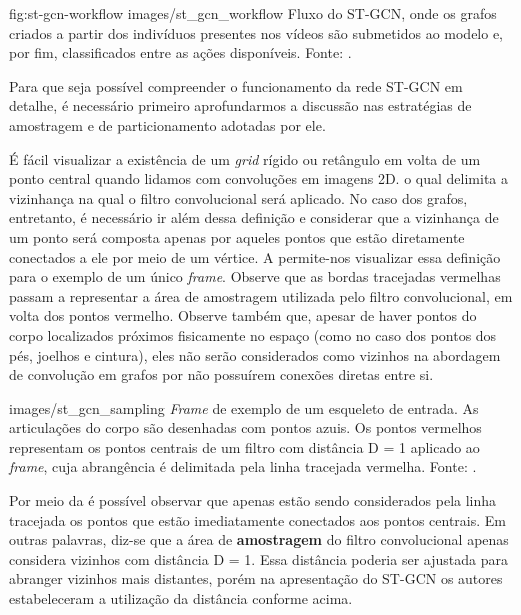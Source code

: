 \image
    {fig:st-gcn-workflow}
    {images/st_gcn_workflow}
    {Fluxo do ST-GCN, onde os grafos criados a partir dos indivíduos presentes nos vídeos são submetidos ao modelo e, por fim, classificados entre as ações disponíveis. Fonte: \cite[p. 3]{st-gcn-2018}.}



Para que seja possível compreender o funcionamento da rede ST-GCN em detalhe, é necessário primeiro aprofundarmos a discussão nas estratégias de amostragem e de particionamento adotadas por ele. 

É fácil visualizar a existência de um \textit{grid} rígido ou retângulo em volta de um ponto central quando lidamos com convoluções em imagens 2D. o qual delimita a vizinhança na qual o filtro convolucional será aplicado. No caso dos grafos, entretanto, é necessário ir além dessa definição e considerar que a vizinhança de um ponto será composta apenas por aqueles pontos que estão diretamente conectados a ele por meio de um vértice. A  permite-nos visualizar essa definição para o exemplo de um único \textit{frame}. Observe que as bordas tracejadas vermelhas passam a representar a área de amostragem utilizada pelo filtro convolucional, em volta dos pontos vermelho. Observe também que, apesar de haver pontos do corpo localizados próximos fisicamente no espaço (como no caso dos pontos dos pés, joelhos e cintura), eles não serão considerados como vizinhos na abordagem de convolução em grafos por não possuírem conexões diretas entre si.

    {images/st_gcn_sampling}
    {\textit{Frame} de exemplo de um esqueleto de entrada. As articulações do corpo são desenhadas com pontos azuis. Os pontos vermelhos representam os pontos centrais de um filtro com distância D = 1 aplicado ao \textit{frame}, cuja abrangência é delimitada pela linha tracejada vermelha. Fonte: \cite[p. 5]{st-gcn-2018}.}

Por meio da  é possível observar que apenas estão sendo considerados pela linha tracejada os pontos que estão imediatamente conectados aos pontos centrais. Em outras palavras, diz-se que a área de \textbf{amostragem} do filtro convolucional apenas considera vizinhos com distância D = 1. Essa distância poderia ser ajustada para abranger vizinhos mais distantes, porém na apresentação do ST-GCN \cite{st-gcn-2018} os autores estabeleceram a utilização da distância conforme acima.

